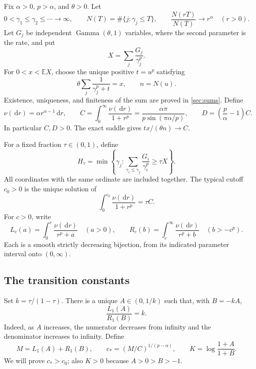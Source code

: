 \documentclass[11pt,letterpaper]{article}
\numberwithin{equation}{section}
\theoremstyle{definition}
\theoremstyle{remark}
\newcommand{\EE}{\mathbb E}
\newcommand{\dd}{\,\mathrm d}
\newcommand{\Gam}{\operatorname{Gamma}}
\begin{document}
Fix $\alpha>0$, $p>\alpha$, and $\theta>0$. Let
\begin{equation}\label{eq:RV}
 0<\gamma_1\le\gamma_2\le\cdots\longrightarrow\infty,
 \qquad N(T)=\#\{j:\gamma_j\le T\},
 \qquad \frac{N(rT)}{N(T)}\longrightarrow r^\alpha\quad(r>0).
\end{equation}
Let $G_j$ be independent $\Gam(\theta,1)$ variables, where the second parameter is the rate, and put
\begin{equation}\label{eq:Xgeneral}
 X=\sum_j\frac{G_j}{\gamma_j^p}.
\end{equation}
For $0<x<\EE X$, choose the unique positive $t=u^p$ satisfying
\begin{equation}\label{eq:exact_saddle}
 \theta\sum_j\frac1{\gamma_j^p+t}=x,
 \qquad n=N(u).
\end{equation}
Existence, uniqueness, and finiteness of the sum are proved in \cref{sec:sums}. Define
\begin{equation}\label{eq:CD}
 \nu(\dd r)=\alpha r^{\alpha-1}\dd r,
 \qquad C=\int_0^\infty\frac{\nu(\dd r)}{1+r^p}
       =\frac{\alpha\pi}{p\sin(\pi\alpha/p)},
 \qquad D=\left(\frac p\alpha-1\right)C.
\end{equation}
In particular $C,D>0$. The exact saddle gives $tx/(\theta n)\to C$.

For a fixed fraction $\tau\in(0,1)$, define
\begin{equation}\label{eq:Htau}
 H_\tau=\min\left\{\gamma_j:
 \sum_{\gamma_i\le\gamma_j}\frac{G_i}{\gamma_i^p}\ge\tau X\right\}.
\end{equation}
All coordinates with the same ordinate are included together. The typical cutoff $c_0>0$ is the unique solution of
\begin{equation}\label{eq:c0}
 \int_0^{c_0}\frac{\nu(\dd r)}{1+r^p}=\tau C.
\end{equation}
For $c>0$, write
\begin{equation}\label{eq:LR}
 L_c(a)=\int_0^c\frac{\nu(\dd r)}{r^p+a}\quad(a>0),
 \qquad R_c(b)=\int_c^\infty\frac{\nu(\dd r)}{r^p+b}\quad(b>-c^p).
\end{equation}
Each is a smooth strictly decreasing bijection, from its indicated parameter interval onto $(0,\infty)$.

\subsection{The transition constants}

Set $k=\tau/(1-\tau)$. There is a unique $A\in(0,1/k)$ such that, with $B=-kA$,
\begin{equation}\label{eq:AB}
 \frac{L_1(A)}{R_1(B)}=k.
\end{equation}
Indeed, as $A$ increases, the numerator decreases from infinity and the denominator increases to infinity. Define
\begin{equation}\label{eq:cstar}
 M=L_1(A)+R_1(B),\qquad
 c_*=(M/C)^{1/(p-\alpha)},\qquad
 K=\log\frac{1+A}{1+B}.
\end{equation}
We will prove $c_*>c_0$; also $K>0$ because $A>0>B>-1$.
\end{document}
